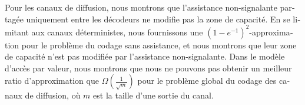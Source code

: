 \begin{otherlanguage}{french}
  Pour les canaux de diffusion, nous montrons que l'assistance non-signalante partagée uniquement entre les décodeurs ne modifie pas la zone de capacité. En se limitant aux canaux déterministes, nous fournissons une $(1-e^{-1})^2$-approximation pour le problème du codage sans assistance, et nous montrons que leur zone de capacité n'est pas modifiée par l'assistance non-signalante. Dans le modèle d'accès par valeur, nous montrons que nous ne pouvons pas obtenir un meilleur ratio d'approximation que $\Omega\left(\frac{1}{\sqrt{m}}\right)$ pour le problème global du codage des canaux de diffusion, où $m$ est la taille d'une sortie du canal.
\end{otherlanguage}
